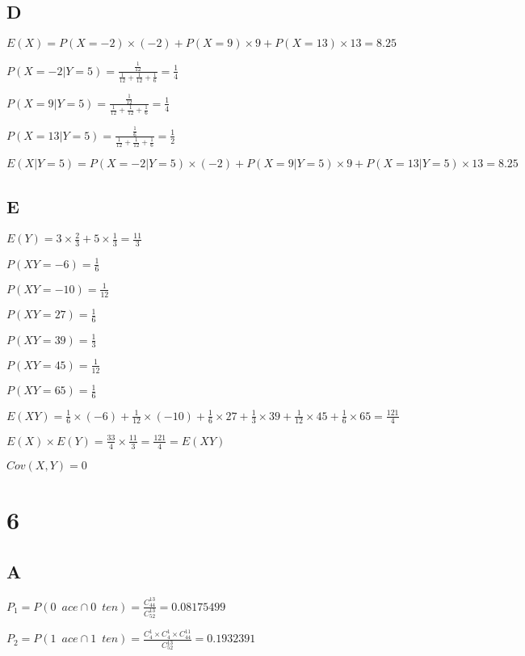 \documentclass{article}
\begin{document}
	\subsection*{D}
	
	$E(X)=P(X=-2)\times(-2)+P(X=9)\times 9+P(X=13)\times 13=8.25$
	
	\hspace*{\fill}
	
	$P(X=-2|Y=5)=\frac{\frac{1}{12}}{\frac{1}{12}+\frac{1}{12}+\frac{1}{6}}=\frac{1}{4}$
	
	$P(X=9|Y=5)=\frac{\frac{1}{12}}{\frac{1}{12}+\frac{1}{12}+\frac{1}{6}}=\frac{1}{4}$

	$P(X=13|Y=5)=\frac{\frac{1}{6}}{\frac{1}{12}+\frac{1}{12}+\frac{1}{6}}=\frac{1}{2}$

	$E(X|Y=5)=P(X=-2|Y=5)\times (-2)+P(X=9|Y=5)\times 9+P(X=13|Y=5)\times 13=8.25$
	
	\subsection*{E}
	
	$E(Y)=3\times\frac{2}{3}+5\times\frac{1}{3}=\frac{11}{3}$
	
	$P(XY=-6)=\frac{1}{6}$
	
	$P(XY=-10)=\frac{1}{12}$
	
	$P(XY=27)=\frac{1}{6}$
	
	$P(XY=39)=\frac{1}{3}$
	
	$P(XY=45)=\frac{1}{12}$
	
	$P(XY=65)=\frac{1}{6}$
	
	$E(XY)=\frac{1}{6}\times(-6)+\frac{1}{12}\times(-10)+\frac{1}{6}\times 27+\frac{1}{3}\times 39+\frac{1}{12}\times 45+\frac{1}{6}\times 65=\frac{121}{4}$
	
	$E(X)\times E(Y)=\frac{33}{4}\times \frac{11}{3}=\frac{121}{4}=E(XY)$
	
	$Cov(X,Y)=0$
	
	\section*{6}
	
	\subsection*{A}
	
	$P_1=P(0\enspace ace\cap 0\enspace ten)=\frac{C_{44}^{13}}{C_{52}^{13}}=0.08175499$
	
	$P_2=P(1\enspace ace\cap 1\enspace ten)=\frac{C_4^1\times C_4^1\times C_{44}^{11}}{C_{52}^{13}}=0.1932391$
	
\end{document}
